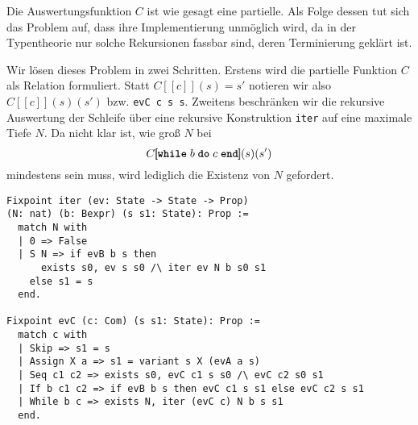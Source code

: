 \documentclass[8pt,fleqn,aspectratio=169]{beamer}
\newcommand{\ttq}{\textquotesingle}
\newcommand{\parspace}{\vspace{0.8em}}
\newcommand{\kw}[1]{\textbf{\texttt{#1}}}
\newcommand{\code}[1]{{\texttt{#1}}}
\newcommand{\qb}[1]{[\!\![#1]\!\!]}
\begin{document}
\begin{frame}
Die Auswertungsfunktion $C$ ist wie gesagt eine partielle. Als Folge
dessen tut sich das Problem auf, dass ihre Implementierung unmöglich
wird, da in der Typentheorie nur solche Rekursionen fassbar
sind, deren Terminierung geklärt ist.

\parspace
Wir lösen dieses Problem in zwei Schritten. Erstens wird die partielle
Funktion $C$ als Relation formuliert. Statt $C\qb{c}(s)=s'$ notieren
wir also $C\qb{c}(s)(s')$ bzw. \code{evC c s s\ttq}. Zweitens beschränken
wir die rekursive Auswertung der Schleife über eine rekursive
Konstruktion \code{iter} auf eine maximale Tiefe $N$. Da nicht klar
ist, wie groß $N$ bei
\[C\qb{\kw{while}\; b\; \kw{do}\; c\; \kw{end}}(s)(s')\]
mindestens sein muss, wird lediglich die Existenz von $N$ gefordert.
\end{frame}

\begin{frame}[fragile]
\begin{lstlisting}[language=Coq, xleftmargin=\mathindent]
Fixpoint iter (ev: State -> State -> Prop)
(N: nat) (b: Bexpr) (s s1: State): Prop :=
  match N with
  | 0 => False
  | S N => if evB b s then
      exists s0, ev s s0 /\ iter ev N b s0 s1
    else s1 = s
  end.

Fixpoint evC (c: Com) (s s1: State): Prop :=
  match c with
  | Skip => s1 = s
  | Assign X a => s1 = variant s X (evA a s)
  | Seq c1 c2 => exists s0, evC c1 s s0 /\ evC c2 s0 s1
  | If b c1 c2 => if evB b s then evC c1 s s1 else evC c2 s s1
  | While b c => exists N, iter (evC c) N b s s1
  end.
\end{lstlisting}
\end{frame}
\end{document}
